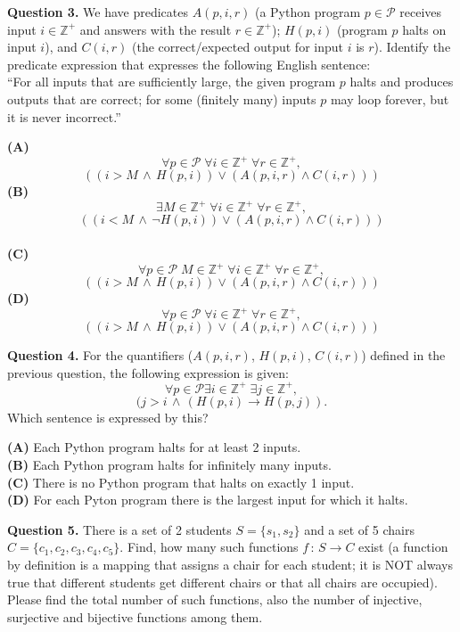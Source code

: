 \documentclass[jou]{apa6}
\begin{document}
{\bf Question 3.} We have predicates $A(p,i,r)$ (a Python program 
$p \in \mathcal{P}$ receives input $i \in \mathbb{Z}^{+}$ and answers
with the result $r \in \mathbb{Z}^{+}$); $H(p,i)$ (program $p$ halts on input $i$), 
and $C(i,r)$ (the correct/expected output for input $i$ is $r$). 
Identify the predicate expression that expresses the following English sentence:\\
``For all inputs that are sufficiently large, the given program $p$ 
halts and produces outputs that are correct; for some (finitely many) inputs $p$ 
may loop forever, but it is never incorrect.''

{\large
\noindent
{\normalsize \bf (A)}
$$\forall p \in \mathcal{P}\; \forall i \in \mathbb{Z}^{+}\; \forall r \in \mathbb{Z}^{+},$$
$$((i > M \,\wedge\, H(p,i)) \vee (A(p,i,r) \wedge C(i,r)))$$
{\normalsize \bf (B)}
$$\exists M \in \mathbb{Z}^{+}\; \forall i \in \mathbb{Z}^{+}\;
\forall r \in \mathbb{Z}^{+},$$
$$((i < M \,\wedge\, \neg H(p,i)) \vee (A(p,i,r) \wedge C(i,r)))$$\\
{\normalsize \bf (C)}
$$\forall p \in \mathcal{P}\; M \in \mathbb{Z}^{+}\; \forall i \in \mathbb{Z}^{+}\;
\forall r \in \mathbb{Z}^{+},$$
$$((i > M \,\wedge\, H(p,i)) \vee (A(p,i,r) \wedge C(i,r)))$$
{\normalsize \bf (D)}
$$\forall p \in \mathcal{P}\; \forall i \in \mathbb{Z}^{+}\;
\forall r \in \mathbb{Z}^{+},$$ 
$$((i > M \,\wedge\, H(p,i)) \vee (A(p,i,r) \wedge C(i,r)))$$
}



{\bf Question 4.} For the quantifiers 
($A(p,i,r)$, $H(p,i)$, $C(i,r)$) defined in the previous question, 
the following expression is given:
$$\forall p \in \mathcal{P} 
\exists i \in \mathbb{Z}^{+}\; \exists j \in \mathbb{Z}^{+},$$
$$(j > i \,\wedge\, (H(p,i) \rightarrow H(p,j)).$$
Which sentence is expressed by this?

{\bf (A)} Each Python program halts for at least 2 inputs.\\ 
{\bf (B)} Each Python program halts for infinitely many inputs. \\
{\bf (C)} There is no Python program that halts on exactly 1 input. \\
{\bf (D)} For each Pyton program there is the largest input for which it halts.


{\bf Question 5.} 
There is a set of 2 students $S = \{ s_1, s_2 \}$ and 
a set of 5 chairs $C = \{ c_1, c_2, c_3, c_4, c_5 \}$. 
Find, how many such functions $f\,:\,S \rightarrow C$ exist (a function 
by definition is a mapping that assigns a chair for each student;
it is NOT always true that different students get different chairs
or that all chairs are occupied). Please find the total number of 
such functions, also the number of injective, surjective
and bijective functions among them.
\end{document}
